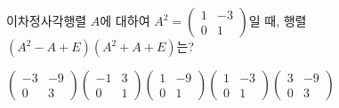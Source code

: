 \hspace*{2mm}\begin{minipage}[t]{\dimexpr\linewidth-2mm\relax}\vspace{0pt}
이차정사각행렬 $A$에 대하여 $A^2=\begin{pmatrix} 1 & -3 \\ 0 & 1 \end{pmatrix}$일 때, 행렬 $(A^2-A+E)(A^2+A+E)$는? 
\begin{choices32}{$\begin{pmatrix} -3 & -9 \\ 0 & 3 \end{pmatrix}$}{$\begin{pmatrix} -1 & 3 \\ 0 & 1 \end{pmatrix}$}{$\begin{pmatrix} 1 & -9 \\ 0 & 1 \end{pmatrix}$}{$\begin{pmatrix} 1 & -3 \\ 0 & 1 \end{pmatrix}$}{$\begin{pmatrix} 3 & -9 \\ 0 & 3 \end{pmatrix}$}\end{choices32}\end{minipage}
